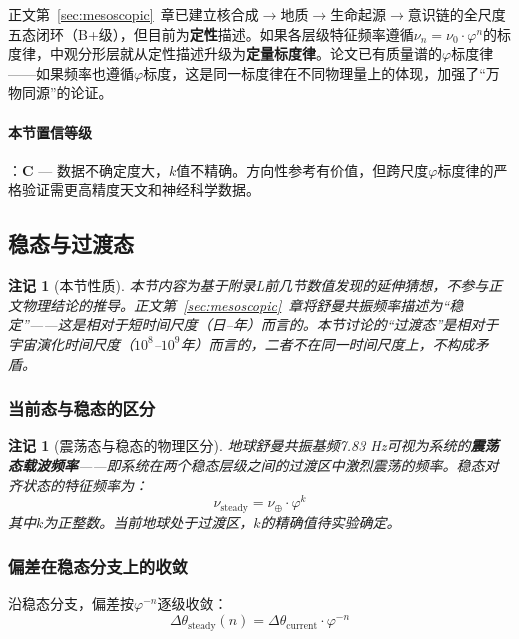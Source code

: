 \documentclass[12pt,a4paper,twocolumn]{article}
\renewcommand{\phi}{\varphi}
\newtheorem{remark}[theorem]{注记}
\begin{document}
正文第~\ref{sec:mesoscopic}~章已建立核合成$\to$地质$\to$生命起源$\to$意识链的全尺度五态闭环（B+级），但目前为\textbf{定性}描述。如果各层级特征频率遵循$\nu_n = \nu_0 \cdot \phi^n$的标度律，中观分形层就从定性描述升级为\textbf{定量标度律}。论文已有质量谱的$\phi$标度律——如果频率也遵循$\phi$标度，这是同一标度律在不同物理量上的体现，加强了``万物同源''的论证。

\paragraph{本节置信等级}：\textbf{C} --- 数据不确定度大，$k$值不精确。方向性参考有价值，但跨尺度$\phi$标度律的严格验证需更高精度天文和神经科学数据。

\subsection{稳态与过渡态}
\label{subsec:steady_transition}

\begin{remark}[本节性质]
本节内容为基于附录L前几节数值发现的延伸猜想，不参与正文物理结论的推导。正文第~\ref{sec:mesoscopic}~章将舒曼共振频率描述为``稳定''——这是相对于短时间尺度（日--年）而言的。本节讨论的``过渡态''是相对于宇宙演化时间尺度（$10^8$--$10^9$年）而言的，二者不在同一时间尺度上，不构成矛盾。
\end{remark}

\subsubsection{当前态与稳态的区分}

\begin{remark}[震荡态与稳态的物理区分]
地球舒曼共振基频7.83 Hz可视为系统的\textbf{震荡态载波频率}——即系统在两个稳态层级之间的过渡区中激烈震荡的频率。稳态对齐状态的特征频率为：
\begin{equation}
\nu_{\text{steady}} = \nu_{\oplus} \cdot \phi^k
\label{eq:steady_freq}
\end{equation}
其中$k$为正整数。当前地球处于过渡区，$k$的精确值待实验确定。
\end{remark}

\subsubsection{偏差在稳态分支上的收敛}

沿稳态分支，偏差按$\phi^{-n}$逐级收敛：
\begin{equation}
\Delta\theta_{\text{steady}}(n) = \Delta\theta_{\text{current}} \cdot \phi^{-n}
\label{eq:deviation_convergence}
\end{equation}
\end{document}
